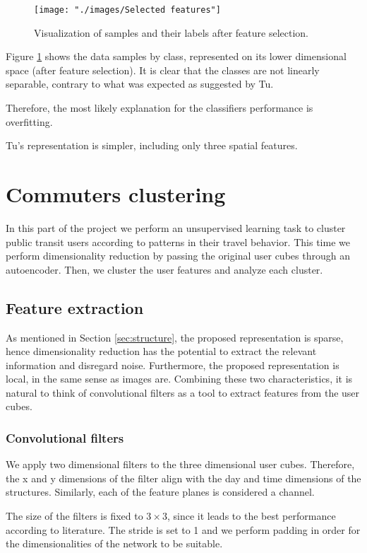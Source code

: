 \documentclass{article}
\begin{document}
\begin{figure}[H]
  \centering
  \texttt{[image: "./images/Selected features"]}
  \caption{Visualization of samples and their labels after feature selection.}
  \label{fig:classification/tsne}
\end{figure}

Figure \ref{fig:classification/tsne} shows the data samples by class, represented on its lower dimensional space (after feature selection). It is clear that the classes are not linearly separable, contrary to what was expected as suggested by Tu. 

Therefore, the most likely explanation for the classifiers performance is overfitting. 

Tu's representation is simpler, including only three spatial features.


\newpage
\section{Commuters clustering}
\label{sec:partIII}
In this part of the project we perform an unsupervised learning task to cluster public transit users according to patterns in their travel behavior. This time we perform dimensionality reduction by passing the original user cubes through an autoencoder. Then, we cluster the user features and analyze each cluster. 

\subsection{Feature extraction}
As mentioned in Section \ref{sec:structure}, the proposed representation is sparse, hence dimensionality reduction has the potential to extract the relevant information and disregard noise. Furthermore, the proposed representation is local, in the same sense as images are. Combining these two characteristics, it is natural to think of convolutional filters as a tool to extract features from the user cubes. 

\subsubsection{Convolutional filters}
We apply two dimensional filters to the three dimensional user cubes. Therefore, the x and y dimensions of the filter align with the day and time dimensions of the structures. Similarly, each of the feature planes is considered a channel. 

The size of the filters is fixed to $3 \times 3$, since it leads to the best performance according to literature. The stride is set to 1 and we perform padding in order for the dimensionalities of the network to be suitable.
\end{document}
